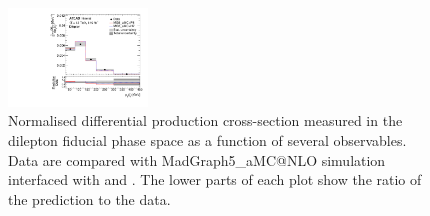 \begin{figure}[ht]
  \includegraphics[width=0.33\textwidth]{figures/diff_xsec/normalized-unfolded-distributions/tty_prod_dilep/DL_tty_prod_ptj1_unfolded_normalized.pdf}%
  \caption{Normalised differential \tty production cross-section measured in the dilepton fiducial phase space as a function of several observables. Data are compared with MadGraph5\_aMC@NLO simulation interfaced with \PYTHIA[8] and \HERWIG[7]. The lower parts of each plot show the ratio of the prediction to the data.}
  \label{fig:tty_prod_diff_DL2_norm}
\end{figure}
\FloatBarrier


